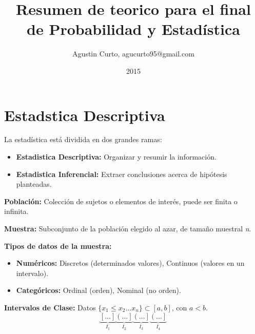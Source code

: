 \documentclass[12pt,a4paper]{report}
\author{Agustin Curto, agucurto95@gmail.com}
\title{Resumen de teorico para el final \\ de Probabilidad y Estadística}
\date{2015}
\begin{document}
\maketitle
\tableofcontents

\chapter{Estadstica Descriptiva}
	\par La estadística está dividida en dos grandes ramas:
	\begin{itemize}
		\item \textbf{Estadistica Descriptiva:} Organizar y resumir la información.
		\item \textbf{Estadistica Inferencial:} Extraer conclusiones acerca de hipótesis planteadas.
	\end{itemize}
	
	\vspace{3mm}
	\par \textbf{Población:} Colección de sujetos o elementos de interés, puede ser finita o infinita.
	
	\vspace{3mm}
	\par \textbf{Muestra:} Subconjunto de la población elegido al azar, de tamaño muestral \textit{n}.
	
	\vspace{3mm}
	\par \textbf{Tipos de datos de la muestra:}
	\begin{itemize}
		\item \textbf{Numéricos:} Discretos (determinados valores), Continuos (valores en un intervalo).
		\item \textbf{Categóricos:} Ordinal (orden), Nominal (no orden).
	\end{itemize}
	
	\vspace{3mm}
	\par \textbf{Intervalos de Clase:} Datos $\lbrace x_{1} \leq x_{2} \dotsc x_{n} \rbrace \subset \left[a, b \right]$, con $a < b$.
	\[
		\underbrace{\left[ \dotsc \right]}_{I_{1}} \underbrace{\left( \dotsc \right]}_{I_{2}} \underbrace{\left( \dotsc \right]}_{I_{3}} \underbrace{\left( \dotsc \right]}_{I_{4}}
	\]
	
\end{document}
